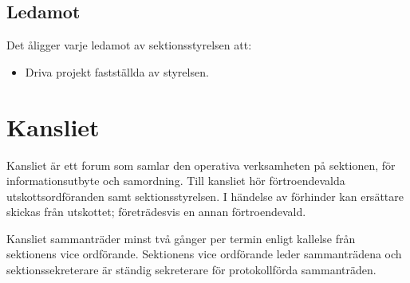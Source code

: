 \documentclass{datateknologsektionen-document}
\begin{document}
\subsection{Ledamot}
\label{ledamot}
Det åligger varje ledamot av sektionsstyrelsen att:
\begin{itemize}
  \item Driva projekt fastställda av styrelsen.
\end{itemize}

\section{Kansliet}
Kansliet är ett forum som samlar den operativa verksamheten på sektionen, för
informationsutbyte och samordning. Till kansliet hör förtroendevalda utskottsordföranden
samt sektionsstyrelsen. I händelse av förhinder kan ersättare skickas från utskottet;
företrädesvis en annan förtroendevald.

Kansliet sammanträder minst två gånger per termin enligt kallelse från sektionens
vice ordförande. Sektionens vice ordförande leder sammanträdena och sektionssekreterare
är ständig sekreterare för protokollförda sammanträden.
\end{document}
